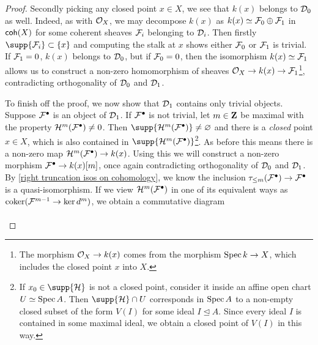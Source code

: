 \begin{proof}
    Secondly picking any closed point $x \in X$, we see that $k(x)$ belongs to $\mathcal D_0$ as well. Indeed, as with $\mathcal{O}_{X}$, we may decompose $k(x)$ as $k(x) \simeq \mathcal F_0 \oplus \mathcal F_1$ in $\mathsf{coh}(X)$ for some coherent sheaves $\mathcal F_i$ belonging to $\mathcal D_i$. Then firstly $\supp{\F_i} \subset \{x\}$ and computing the stalk at $x$ shows either $\mathcal F_0$ or $\mathcal F_1$ is trivial. If $\mathcal F_1 = 0$, $k(x)$ belongs to $\mathcal D_0$, but if $\mathcal F_0 = 0$, then the isomorphism $k(x) \simeq \mathcal F_1$ allows us to construct a non-zero homomorphism of sheaves $\mathcal{O}_{X} \to k(x) \to \mathcal F_1$\footnote{The morphism $\mathcal{O}_{X} \to k(x)$ comes from the morphism $\operatorname{Spec}k \to X$, which includes the closed point $x$ into $X$.}, contradicting orthogonality of $\mathcal D_0$ and $\mathcal D_1$.

    To finish off the proof, we now show that $\mathcal D_1$ contains only trivial objects. Suppose $\mathcal F^\bullet$ is an object of $\mathcal D_1$. If $\mathcal F^\bullet$ is not trivial, let $m \in \mathbf Z$ be maximal with the property $\mathcal H^m(\mathcal F^\bullet) \neq 0$. Then $\supp{\mathcal H^m(\F^\bullet)} \neq \varnothing$ and there is a \emph{closed} point $x \in X$, which is also contained in $\supp{\mathcal H^m(\F^\bullet)}$\footnote{
        If $x_0 \in \supp{\mathcal H}$ is not a closed point, consider it inside an affine open chart $U \simeq \operatorname{Spec}A$. Then $\supp{\mathcal H} \cap U$ corresponds in $\operatorname{Spec}A$ to a non-empty closed subset of the form $V(I)$ for some ideal $I \trianglelefteq A$. Since every ideal $I$ is contained in some maximal ideal, we obtain a closed point of $V(I)$ in this way.
    }. As before this means there is a non-zero map $\mathcal H^m(\mathcal F^\bullet) \to k(x)$. Using this we will construct a non-zero morphism $\mathcal F^\bullet \to k(x)[m]$, once again contradicting orthogonality of $\mathcal D_0$ and $\mathcal D_1$. By \eqref{right truncation isos on cohomology}, we know the inclusion $\tau_{\leq m}(\mathcal F^\bullet) \to \mathcal F^\bullet$ is a quasi-isomorphism. If we view $\mathcal H^m(\mathcal F^\bullet)$ in one of its equivalent ways as $\operatorname{coker}(\mathcal F^{m-1} \to \ker d^m)$, we obtain a commutative diagram
    \[\begin{tikzcd}[row sep = small, column sep = small]

\end{tikzcd}\]
\end{proof}
